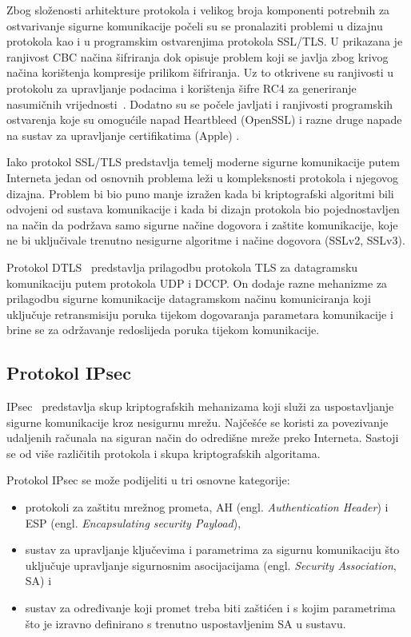 Zbog složenosti arhitekture protokola i velikog broja komponenti potrebnih
za ostvarivanje sigurne komunikacije počeli su se pronalaziti problemi u dizajnu
protokola kao i u programskim ostvarenjima protokola SSL/TLS. U \cite{duong2011here}
prikazana je ranjivost CBC načina šifriranja dok \cite{be2013crime} opisuje
problem koji se javlja zbog krivog načina korištenja kompresije prilikom
šifriranja. Uz to otkrivene su ranjivosti u protokolu za upravljanje podacima
\cite{paterson2013luck13} i korištenja šifre RC4 za generiranje nasumičnih
vrijednosti~\cite{paterson2013rc4}. Dodatno su se počele javljati i
ranjivosti programskih ostvarenja koje su omogućile napad Heartbleed (OpenSSL)
\cite{durumeric2014matter} i razne
druge napade na sustav za upravljanje certifikatima (Apple)
\cite{bland2014finding}.

Iako protokol SSL/TLS predstavlja temelj moderne sigurne komunikacije putem
Interneta jedan od osnovnih problema leži u kompleksnosti protokola i njegovog
dizajna. Problem bi bio puno manje izražen kada bi kriptografski algoritmi bili
odvojeni od sustava komunikacije i kada bi dizajn protokola bio pojednostavljen
na način da podržava samo sigurne načine dogovora i zaštite komunikacije, koje ne
bi
uključivale trenutno nesigurne algoritme i načine dogovora (SSLv2, SSLv3).

Protokol DTLS~\cite{rfc6347} predstavlja prilagodbu protokola TLS za datagramsku
komunikaciju putem protokola UDP i DCCP\@. On dodaje razne mehanizme za
prilagodbu sigurne komunikacije datagramskom načinu komuniciranja koji uključuje
retransmisiju poruka tijekom dogovaranja parametara komunikacije i brine se za
održavanje redoslijeda poruka tijekom komunikacije.

\subsection{Protokol IPsec}
IPsec~\cite{rfc4301} predstavlja skup kriptografskih mehanizama koji služi za
uspostavljanje sigurne komunikacije kroz
nesigurnu mrežu. Najčešće se koristi za povezivanje udaljenih računala na
siguran način do odredišne mreže preko Interneta. Sastoji se od više različitih
protokola i skupa kriptografskih algoritama. 

Protokol IPsec se može podijeliti u tri osnovne kategorije:
\begin{itemize}
    \item protokoli za zaštitu mrežnog prometa, AH (engl. \emph{Authentication
	Header})
	i ESP (engl. \emph{Encapsulating security Payload}),
    \item sustav za upravljanje ključevima i parametrima za sigurnu
	komunikaciju što uključuje upravljanje sigurnosnim asocijacijama (engl.
	\emph{Security Association}, SA) i
    \item sustav za određivanje koji promet treba biti zaštićen i s kojim
	parametrima što je izravno definirano s trenutno uspostavljenim SA u
	sustavu.
\end{itemize}

